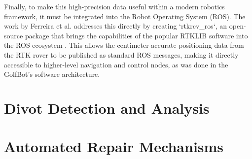 Finally, to make this high-precision data useful within a modern robotics framework, it must be integrated into the Robot Operating System (ROS). The work by Ferreira et al. addresses this directly by creating `rtkrcv_ros`, an open-source package that brings the capabilities of the popular RTKLIB software into the ROS ecosystem \cite{ferreira2020realtime}. This allows the centimeter-accurate positioning data from the RTK rover to be published as standard ROS messages, making it directly accessible to higher-level navigation and control nodes, as was done in the GolfBot's software architecture. 

\section{Divot Detection and Analysis}

\section{Automated Repair Mechanisms}


